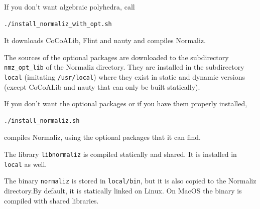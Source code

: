 If you don't want algebraic polyhedra, call
\begin{Verbatim}
./install_normaliz_with_opt.sh
\end{Verbatim}
It downloads CoCoALib, Flint and nauty and compiles Normaliz.

The sources of the optional packages are downloaded to the subdirectory \verb|nmz_opt_lib| of the Normaliz directory. They are installed in the subdirectory \verb|local| (imitating \verb|/usr/local|) where they exist in static and dynamic versions (except CoCoALib and nauty that can only be built statically).

If you don't want the optional packages or if you have them properly installed,
\begin{Verbatim}
./install_normaliz.sh
\end{Verbatim}
compiles Normaliz, using the optional packages that it can find.

The library \verb|libnormaliz| is compiled statically and shared. It is installed in \verb|local| as well.

The binary \verb|normaliz| is stored in \verb|local/bin|, but it is also copied to the Normaliz directory.By default, it is statically linked on Linux. On MacOS the binary is compiled with shared libraries. 

